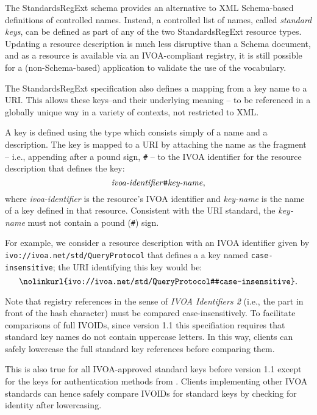 \documentclass[11pt,a4paper]{ivoa}
\begin{document}
The StandardsRegExt schema provides an alternative to XML Schema-based
definitions of controlled names.  Instead, a controlled list of names,
called \emph{standard keys}, can be defined as part of any of the two
StandardsRegExt resource types.  Updating a resource description is much
less disruptive than a Schema document, and as a resource is available
via an IVOA-compliant registry, it is still possible for a
(non-Schema-based) application to validate the use of the vocabulary.




The StandardsRegExt specification also defines a mapping from a key name to
a URI.  This allows these keys--and their underlying meaning -- to be
referenced in a globally unique way in a variety of contexts, not
restricted to XML.



A key is defined using the  type which
consists simply of a name and a description.  The key is mapped to a
URI by attaching the name as the fragment -- i.e., appending after a
pound sign, \verb|#| -- to the IVOA identifier for the resource
description that defines the key:
$$
\hbox{\emph{ivoa-identifier}\verb|#|\emph{key-name}},
$$
where \emph{ivoa-identifier} is the resource's IVOA identifier and
\emph{key-name} is the name of a key defined in that resource.
Consistent with the URI standard, the
\emph{key-name} must not contain a pound (\verb|#|) sign.



For example, we consider a resource description with an IVOA
identifier given by
\nolinkurl{ivo://ivoa.net/std/QueryProtocol} that
defines a a key named \texttt{case-insensitive}; the URI
identifying this key would be:
$$
\hbox{\nolinkurl{ivo://ivoa.net/std/QueryProtocol#case-insensitive}}.
$$

Note that registry references in the sense of \emph{IVOA Identifiers 2}
(i.e., the part in front of the hash character) must be compared
case-insensitively.  To facilitate comparisons of full IVOIDs, since
version 1.1 this specifiation requires that standard key names do not
contain uppercase letters.  In this way, clients can safely lowercase
the full standard key references before comparing them.

This is also true for all IVOA-approved standard keys before version 1.1
except for the keys for authentication methods from
\citet{2017ivoa.spec.0524T}.  Clients implementing other IVOA standards
can hence safely compare IVOIDs for standard keys by checking for
identity after lowercasing.
\end{document}
